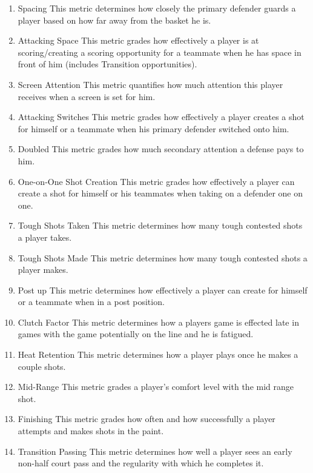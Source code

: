\documentclass{article}
\begin{document}
\begin{enumerate}[nolistsep]%
\item Spacing
\subitem This metric determines how closely the primary defender guards a 
\subitem player based on how far away from the basket he is.
\item Attacking Space
\subitem This metric grades how effectively a player is at scoring/creating
\subitem a scoring opportunity for a teammate when he has space in front of 
\subitem him (includes Transition opportunities).
\item Screen Attention
\subitem This metric quantifies how much attention this player receives when 
\subitem a screen is set for him.
\item Attacking Switches
\subitem This metric grades how effectively a player creates a shot for himself
\subitem or a teammate when his primary defender switched onto him.
\item Doubled
\subitem This metric grades how much secondary attention a defense pays to him.
\item One-on-One Shot Creation
\subitem This metric grades how effectively a player can create a shot for 
\subitem himself or his teammates when taking on a defender one on one.
\item Tough Shots Taken
\subitem This metric determines how many tough contested shots a player takes.
\item Tough Shots Made
\subitem This metric determines how many tough contested shots a player makes.
\item Post up
\subitem This metric determines how effectively a player can create for himself
\subitem or a teammate when in a post position.
\item Clutch Factor
\subitem This metric determines how a players game is effected late in games 
\subitem with the game potentially on the line and he is fatigued.
\item Heat Retention
\subitem This metric determines how a player plays once he makes a couple
\subitem shots.
\item Mid-Range
\subitem This metric grades a player's comfort level with the mid range shot.
\item Finishing
\subitem This metric grades how often and how successfully a player attempts
\subitem and makes shots in the paint.
\item Transition Passing
\subitem This metric determines how well a player sees an early non-half court
\subitem pass and the regularity with which he completes it.
\end{enumerate}
\end{document}
